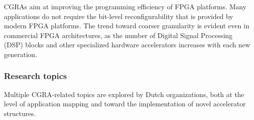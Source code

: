 CGRAs aim at improving the programming efficiency of %
FPGA platforms. Many applications do not require the bit-level reconfigurability that is provided by modern %
FPGA platforms. 
The trend toward coarser granularity is evident even in commercial FPGA architectures, as the number of Digital Signal Processing (DSP) blocks and other specialized hardware accelerators increases with each new generation.
%

\subsubsection*{\bf{Research topics}}
Multiple CGRA-related topics are explored %
by Dutch organizations, both at the level of application mapping and toward  the implementation of novel accelerator structures.



